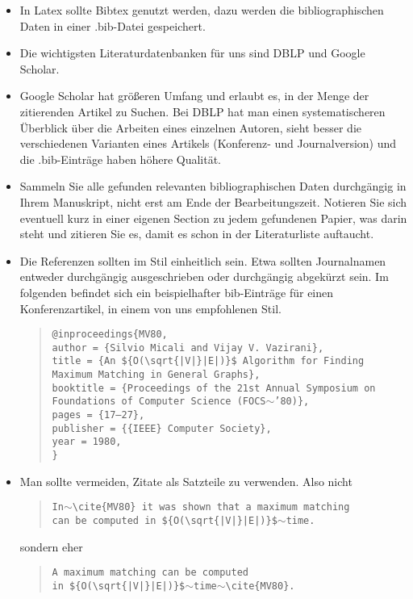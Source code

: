 \documentclass[12pt,a4paper]{article}
\begin{document}
\begin{itemize}



\item In Latex sollte Bibtex genutzt werden, dazu werden die bibliographischen Daten in
  einer .bib-Datei gespeichert.
\item Die wichtigsten Literaturdatenbanken für uns sind DBLP und Google Scholar.
\item Google Scholar hat größeren Umfang und erlaubt es, in der Menge der zitierenden
  Artikel zu Suchen. Bei DBLP hat man einen systematischeren Überblick über die Arbeiten eines einzelnen Autoren, sieht besser die verschiedenen Varianten eines Artikels (Konferenz- und Journalversion) und die .bib-Einträge haben höhere Qualität.
\item Sammeln Sie alle gefunden relevanten bibliographischen Daten durchgängig in Ihrem
  Manuskript, nicht erst am Ende der Bearbeitungszeit. Notieren Sie sich eventuell kurz in
  einer eigenen Section zu jedem gefundenen Papier, was darin steht und zitieren Sie es,
  damit es schon in der Literaturliste auftaucht.
\item Die Referenzen sollten im Stil einheitlich sein. Etwa sollten Journalnamen entweder durchgängig ausgeschrieben oder durchgängig abgekürzt sein. Im folgenden befindet sich ein beispielhafter bib-Einträge für einen Konferenzartikel, in einem von uns empfohlenen Stil.
  \begin{quote}
    \texttt{@inproceedings\{MV80,\\
  \quad author    = \{Silvio Micali and
               Vijay V. Vazirani\},\\
  \quad title     = \{An \$\{O(\textbackslash{}sqrt\{|V|\}|E|)\}\$ Algorithm
               for Finding Maximum Matching in General Graphs\},\\
  \quad booktitle = \{Proceedings of the 21st Annual Symposium on Foundations of Computer Science (FOCS$\sim$'80)\},\\
  \quad pages     = \{17--27\},\\
  \quad publisher = \{\{IEEE\} Computer Society\},\\
  year      = 1980,\\
  \}
}
  \end{quote}
\item Man sollte vermeiden, Zitate als Satzteile zu verwenden. Also nicht
  \begin{quote}
    \texttt{In$\sim$\textbackslash{}cite\{MV80\} it was shown that a maximum matching\\ can be computed
    in \$\{O(\textbackslash{}sqrt\{|V|\}|E|)\}\$$\sim$time.}
  \end{quote}
  sondern eher
  \begin{quote}
    \texttt{A maximum matching can be computed\\
    in \$\{O(\textbackslash{}sqrt\{|V|\}|E|)\}\$$\sim$time$\sim$\textbackslash{}cite\{MV80\}.}
  \end{quote}  
\end{itemize}
\end{document}
